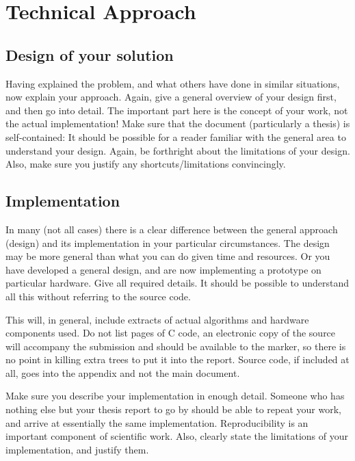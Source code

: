 \chapter{Technical Approach}

\section{Design of your solution}

Having explained the problem, and what others have done in similar situations, now explain your approach. Again, give a general overview of your design first, and then go into detail. The important part here is the concept of your work, not the actual implementation! Make sure that the document (particularly a thesis) is self-contained: It should be possible for a reader familiar with the general area to understand your design. Again, be forthright about the limitations of your design. Also, make sure you justify any shortcuts/limitations convincingly.

\section{Implementation}

In many (not all cases) there is a clear difference between the general approach (design) and its implementation in your particular circumstances. The design may be more general than what you can do given time and resources. Or you have developed a general design, and are now implementing a prototype on particular hardware. Give all required details. It should be possible to understand all this without referring to the source code. 

This will, in general, include extracts of actual algorithms and hardware components used. Do not list pages of C code, an electronic copy of the source will accompany the submission and should be available to the marker, so there is no point in killing extra trees to put it into the report. Source code, if included at all, goes into the appendix and not the main document.

Make sure you describe your implementation in enough detail. Someone who has nothing else but your thesis report to go by should be able to repeat your work, and arrive at essentially the same implementation. Reproducibility is an important component of scientific work. Also, clearly state the limitations of your implementation, and justify them.


